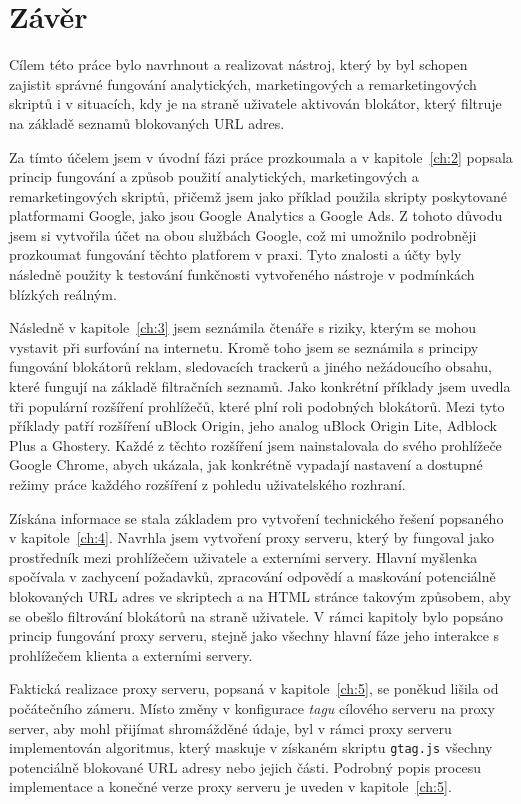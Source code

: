\chapter{Závěr}
\label{ch:7}
Cílem této práce bylo navrhnout a realizovat nástroj, který by byl schopen zajistit správné fungování analytických, marketingových a remarketingových skriptů i v situacích, kdy je na straně uživatele aktivován blokátor, který filtruje na základě seznamů blokovaných URL adres.

Za tímto účelem jsem v úvodní fázi práce prozkoumala a v kapitole~\ref{ch:2} popsala princip fungování a způsob použití analytických, marketingových a remarketingových skriptů, přičemž jsem jako příklad použila skripty poskytované platformami Google, jako jsou Google Analytics a Google Ads. Z tohoto důvodu jsem si vytvořila účet na obou službách Google, což mi umožnilo podrobněji prozkoumat fungování těchto platforem v praxi. Tyto znalosti a účty byly následně použity k testování funkčnosti vytvořeného nástroje v podmínkách blízkých reálným.

Následně v kapitole~\ref{ch:3} jsem seznámila čtenáře s riziky, kterým se mohou vystavit při surfování na internetu. Kromě toho jsem se seznámila s principy fungování blokátorů reklam, sledovacích trackerů a jiného nežádoucího obsahu, které fungují na základě filtračních seznamů. Jako konkrétní příklady jsem uvedla tři populární rozšíření prohlížečů, které plní roli podobných blokátorů. Mezi tyto příklady patří rozšíření uBlock Origin, jeho analog uBlock Origin Lite, Adblock Plus a Ghostery. Každé z těchto rozšíření jsem nainstalovala do svého prohlížeče Google Chrome, abych ukázala, jak konkrétně vypadají nastavení a dostupné režimy práce každého rozšíření z pohledu uživatelského rozhraní. 

Získána informace se stala základem pro vytvoření technického řešení popsaného v kapitole~\ref{ch:4}. Navrhla jsem vytvoření proxy serveru, který by fungoval jako prostředník mezi prohlížečem uživatele a externími servery. Hlavní myšlenka spočívala v zachycení požadavků, zpracování odpovědí a maskování potenciálně blokovaných URL adres ve skriptech a na HTML stránce takovým způsobem, aby se obešlo filtrování blokátorů na straně uživatele. V rámci kapitoly bylo popsáno princip fungování proxy serveru, stejně jako všechny hlavní fáze jeho interakce s prohlížečem klienta a externími servery.

Faktická realizace proxy serveru, popsaná v kapitole~\ref{ch:5}, se poněkud lišila od počátečního zámeru. Místo změny v konfigurace {\it tagu} cílového serveru na proxy server, aby mohl přijímat shromážděné údaje, byl v rámci proxy serveru implementován algoritmus, který maskuje v získaném skriptu \texttt{gtag.js} všechny potenciálně blokované URL adresy nebo jejich části. Podrobný popis procesu implementace a konečné verze proxy serveru je uveden v kapitole~\ref{ch:5}.

